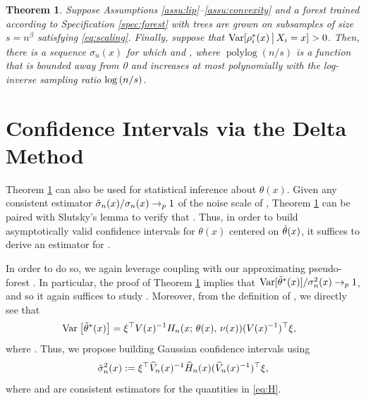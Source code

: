 \documentclass[aos]{imsart}
\theoremstyle{plain}
\newtheorem{theo}[prop]{Theorem}
\theoremstyle{definition}
\theoremstyle{remark}
\begin{document}
\begin{CJK}{UTF8}{gbsn}
\begin{theo}
\label{theo:gauss}
Suppose Assumptions \ref{assu:lip}--\ref{assu:convexity} and
a forest trained according to Specification \ref{spec:forest} with
trees are grown on subsamples of size $s = n^\beta $ satisfying \eqref{eq:scaling}.
Finally, suppose that $\operatorname{Var}[\rho_i^*(x) \,\big|\, X_i = x] > 0$. Then, there is a sequence
$\sigma_n(x)$ for which
 and
,
where $\operatorname{polylog}(n/s)$ is a function that is bounded away from 0 and
increases at most polynomially with the log-inverse sampling ratio $\log\left(n/s\right)$.
\end{theo}



\section{Confidence Intervals via the Delta Method}
\label{sec:delta_method}

Theorem \ref{theo:gauss} can also be used for statistical inference about $\theta(x)$. Given any
consistent estimator $\hat{\sigma}_n(x)/\sigma_n(x) \rightarrow_p 1$ of the noise scale
of , Theorem \ref{theo:gauss} can be paired with Slutsky's lemma
to verify that
.
Thus, in order to build asymptotically valid confidence intervals for $\theta(x)$ centered on $\hat{\theta}(x)$,
it suffices to derive an estimator for .

In order to do so, we again leverage coupling with our approximating pseudo-forest .
In particular, the proof of Theorem \ref{theo:gauss} implies that 
$\text{Var}[\tilde{\theta}^*(x)]/\sigma^2_n(x) \rightarrow_p 1$, and so it again suffices to study
 . Moreover, from the definition of , we directly see that
\begin{equation}
\label{eq:H}
\begin{split}
&\Var{\ttheta^*(x)} = \xi^\top V(x)^{-1} H_n(x; \, \theta(x), \, \nu(x)) (V(x)^{-1})^\top \xi,
\end{split}
\end{equation}
where .
Thus, we propose building Gaussian confidence intervals using
\begin{equation}
\label{eq:sigma_hat}
\hsigma_n^2(x) := \xi^\top \hV_n(x)^{-1} \hH_n(x) (\hV_n(x)^{-1})^\top \xi,
\end{equation}
where  and  are consistent estimators
for the quantities in \eqref{eq:H}.


\end{CJK}
\end{document}

